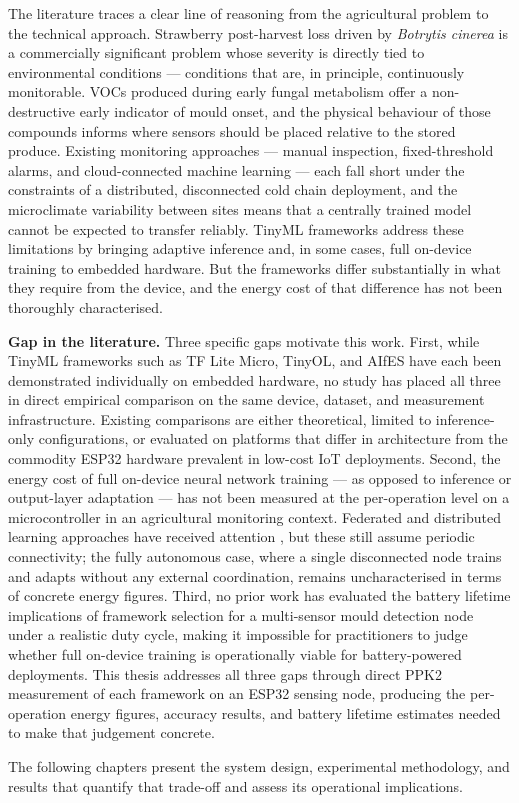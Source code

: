 The literature traces a clear line of reasoning from the agricultural problem to the technical approach. Strawberry post-harvest loss driven by \textit{Botrytis cinerea} is a commercially significant problem whose severity is directly tied to environmental conditions --- conditions that are, in principle, continuously monitorable. VOCs produced during early fungal metabolism offer a non-destructive early indicator of mould onset, and the physical behaviour of those compounds informs where sensors should be placed relative to the stored produce. Existing monitoring approaches --- manual inspection, fixed-threshold alarms, and cloud-connected machine learning --- each fall short under the constraints of a distributed, disconnected cold chain deployment, and the microclimate variability between sites means that a centrally trained model cannot be expected to transfer reliably. TinyML frameworks address these limitations by bringing adaptive inference and, in some cases, full on-device training to embedded hardware. But the frameworks differ substantially in what they require from the device, and the energy cost of that difference has not been thoroughly characterised.

\textbf{Gap in the literature.} Three specific gaps motivate this work. First, while TinyML frameworks such as TF Lite Micro, TinyOL, and AIfES have each been demonstrated individually on embedded hardware, no study has placed all three in direct empirical comparison on the same device, dataset, and measurement infrastructure. Existing comparisons are either theoretical, limited to inference-only configurations, or evaluated on platforms that differ in architecture from the commodity ESP32 hardware prevalent in low-cost IoT deployments. Second, the energy cost of full on-device neural network training --- as opposed to inference or output-layer adaptation --- has not been measured at the per-operation level on a microcontroller in an agricultural monitoring context. Federated and distributed learning approaches have received attention \cite{Ficco2024}, but these still assume periodic connectivity; the fully autonomous case, where a single disconnected node trains and adapts without any external coordination, remains uncharacterised in terms of concrete energy figures. Third, no prior work has evaluated the battery lifetime implications of framework selection for a multi-sensor mould detection node under a realistic duty cycle, making it impossible for practitioners to judge whether full on-device training is operationally viable for battery-powered deployments. This thesis addresses all three gaps through direct PPK2 measurement of each framework on an ESP32 sensing node, producing the per-operation energy figures, accuracy results, and battery lifetime estimates needed to make that judgement concrete.

The following chapters present the system design, experimental methodology, and results that quantify that trade-off and assess its operational implications.
